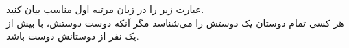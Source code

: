 عبارت زیر را در زبان مرتبه اول مناسب بیان کنید.\\
	هر کسی تمام دوستان یک دوستش را ‌می‌شناسد مگر آنکه دوست دوستش، با بیش از یک نفر از دوستانش دوست باشد.
